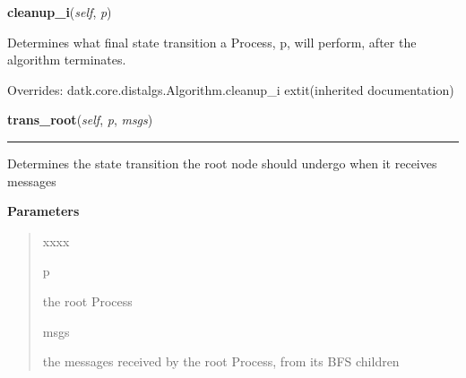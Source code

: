     \vspace{0.5ex}

\hspace{.8\funcindent}\begin{boxedminipage}{\funcwidth}

    \raggedright \textbf{cleanup\_i}(\textit{self}, \textit{p})

\setlength{\parskip}{2ex}
    Determines what final state transition a Process, p, will perform, 
    after the algorithm terminates.

\setlength{\parskip}{1ex}
      Overrides: datk.core.distalgs.Algorithm.cleanup\_i 	extit{(inherited documentation)}

    \end{boxedminipage}

    \label{datk:core:algs:AsynchConvergecast:trans_root}

    \vspace{0.5ex}

\hspace{.8\funcindent}\begin{boxedminipage}{\funcwidth}

    \raggedright \textbf{trans\_root}(\textit{self}, \textit{p}, \textit{msgs})

    \vspace{-1.5ex}

    \rule{\textwidth}{0.5\fboxrule}
\setlength{\parskip}{2ex}
    Determines the state transition the root node should undergo when it 
    receives messages

\setlength{\parskip}{1ex}
      \textbf{Parameters}
      \vspace{-1ex}

      \begin{quote}
        \begin{Ventry}{xxxx}

          \item[p]

          the root Process

          \item[msgs]

          the messages received by the root Process, from its BFS children

        \end{Ventry}

      \end{quote}

    \end{boxedminipage}


